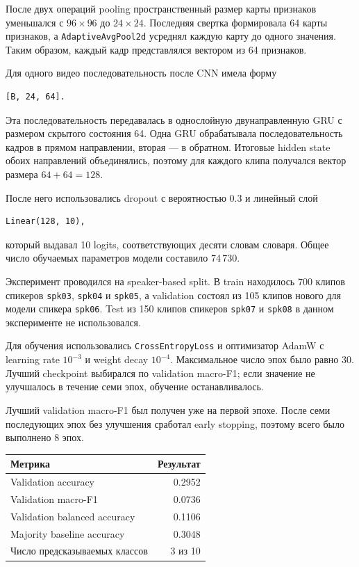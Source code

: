\documentclass[12pt,a4paper]{article}
\begin{document}
После двух операций pooling пространственный размер карты признаков
уменьшался с $96\times96$ до $24\times24$. Последняя свертка формировала
64 карты признаков, а \texttt{AdaptiveAvgPool2d} усреднял каждую карту
до одного значения. Таким образом, каждый кадр представлялся вектором
из 64 признаков.

Для одного видео последовательность после CNN имела форму

\begin{verbatim}
[B, 24, 64].
\end{verbatim}

Эта последовательность передавалась в однослойную двунаправленную GRU
с размером скрытого состояния 64. Одна GRU обрабатывала последовательность
кадров в прямом направлении, вторая --- в обратном. Итоговые hidden state
обоих направлений объединялись, поэтому для каждого клипа получался вектор
размера $64+64=128$.

После него использовались dropout с вероятностью 0.3 и линейный слой

\begin{verbatim}
Linear(128, 10),
\end{verbatim}

который выдавал 10 logits, соответствующих десяти словам словаря.
Общее число обучаемых параметров модели составило 74\,730.

Эксперимент проводился на speaker-based split. В train находилось
700 клипов спикеров \texttt{spk03}, \texttt{spk04} и \texttt{spk05},
а validation состоял из 105 клипов нового для модели спикера
\texttt{spk06}. Test из 150 клипов спикеров \texttt{spk07} и
\texttt{spk08} в данном эксперименте не использовался.

Для обучения использовались \texttt{CrossEntropyLoss} и оптимизатор
AdamW с learning rate $10^{-3}$ и weight decay $10^{-4}$.
Максимальное число эпох было равно 30. Лучший checkpoint выбирался
по validation macro-F1; если значение не улучшалось в течение семи эпох,
обучение останавливалось.

Лучший validation macro-F1 был получен уже на первой эпохе.
После семи последующих эпох без улучшения сработал early stopping,
поэтому всего было выполнено 8 эпох.

\begin{table}[htbp]
\centering
\begin{tabular}{lr}
\toprule
Метрика & Результат \\
\midrule
Validation accuracy & 0.2952 \\
Validation macro-F1 & 0.0736 \\
Validation balanced accuracy & 0.1106 \\
Majority baseline accuracy & 0.3048 \\
Число предсказываемых классов & 3 из 10 \\
\bottomrule
\end{tabular}
\end{table}
\end{document}
